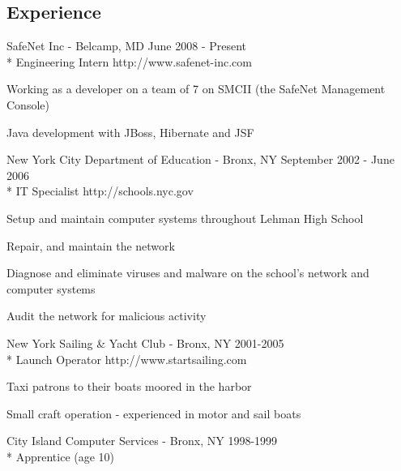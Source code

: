 \documentclass[margin,line]{resume}
\begin{document}
\begin{resume}
\section{\mysidestyle Experience}
	\begin{compactdesc}
		\item[SafeNet Inc] - Belcamp, MD \hfill {\small June 2008 - Present}
		\\* Engineering Intern \hfill {\footnotesize http://www.safenet-inc.com}
		\begin{compactitem}
			\item {\small Working as a developer on a team of 7 on SMCII (the
			SafeNet Management Console)}
			\item {\small Java development with JBoss, Hibernate and JSF}
		\end{compactitem}
		\item[New York City Department of Education] - Bronx, NY \hfill
		{\small September 2002 - June 2006}
		\\* IT Specialist \hfill {\footnotesize http://schools.nyc.gov}
		\begin{compactitem}
			\item {\small Setup and maintain computer systems throughout Lehman
			High School}
			\item {\small Repair, and maintain the network}
			\item {\small Diagnose and eliminate viruses and malware on the
			school's network and computer systems}
			\item {\small Audit the network for malicious activity}
		\end{compactitem}

		\item[New York Sailing \& Yacht Club] - Bronx, NY \hfill {\small
		2001-2005}
		\\* Launch Operator \hfill {\footnotesize http://www.startsailing.com}
		\begin{compactitem}
			\item {\small Taxi patrons to their boats moored in the harbor}
			\item {\small Small craft operation - experienced in motor and sail
			boats}
		\end{compactitem}

		\item[City Island Computer Services] - Bronx, NY \hfill {\small
		1998-1999}
		\\* Apprentice (age 10)
	\end{compactdesc}


\end{resume}
\end{document}
